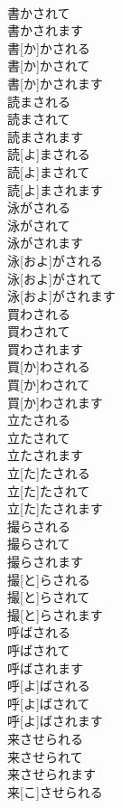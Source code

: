 \documentclass[8pt]{extreport}
\begin{document}
\begin{CJK}{UTF8}{min}
\\	書かされて 
\\	書かされます	
\\	書[か]かされる 
\\	書[か]かされて 
\\	書[か]かされます
\\	読まされる 
\\	読まされて 
\\	読まされます	
\\	読[よ]まされる 
\\	読[よ]まされて 
\\	読[よ]まされます
\\	泳がされる 
\\	泳がされて 
\\	泳がされます	
\\	泳[およ]がされる 
\\	泳[およ]がされて 
\\	泳[およ]がされます
\\	買わされる 
\\	買わされて 
\\	買わされます	
\\	買[か]わされる 
\\	買[か]わされて 
\\	買[か]わされます
\\	立たされる 
\\	立たされて 
\\	立たされます	
\\	立[た]たされる 
\\	立[た]たされて 
\\	立[た]たされます
\\	撮らされる 
\\	撮らされて 
\\	撮らされます	
\\	撮[と]らされる 
\\	撮[と]らされて 
\\	撮[と]らされます
\\	呼ばされる 
\\	呼ばされて 
\\	呼ばされます	
\\	呼[よ]ばされる 
\\	呼[よ]ばされて 
\\	呼[よ]ばされます
\\	来させられる 
\\	来させられて 
\\	来させられます	
\\	来[こ]させられる 

\end{CJK}
\end{document}
